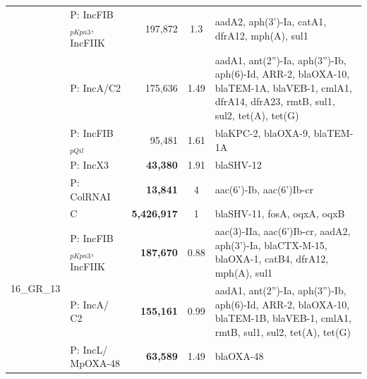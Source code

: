 \begin{landscape}
\begin{table}[!ht]
\begin{tabular}{|l|l|r|c|p{12cm}|}
                            & P: IncFIB$_{pKpn3}$, IncFIIK     & 197,872      & 1.3      & aadA2, aph(3')-Ia, catA1, dfrA12, mph(A), sul1                                                                                             \\ \cline{2-5} 
                            & P: IncA/C2                  & 175,636      & 1.49     & aadA1, ant(2'')-Ia, aph(3'')-Ib, aph(6)-Id, ARR-2, blaOXA-10, blaTEM-1A, blaVEB-1, cmlA1, dfrA14, dfrA23, rmtB, sul1, sul2, tet(A), tet(G) \\ \cline{2-5} 
                            & P: IncFIB$_{pQil}$               & 95,481       & 1.61     & blaKPC-2, blaOXA-9, blaTEM-1A                                                                                                              \\ \cline{2-5} 
                            & P: IncX3                    & \textbf{43,380}       & 1.91     & blaSHV-12                                                                                                                                  \\ \cline{2-5} 
                            & P: ColRNAI                  & \textbf{13,841}       & 4        & aac(6')-Ib, aac(6')Ib-cr                                                                                                                   \\ \hline \hline
\multirow{6}{*}{16\_GR\_13} & C                           & \textbf{5,426,917}     & 1        & blaSHV-11, fosA, oqxA, oqxB                                                                                                                \\ \cline{2-5} 
                            & P: IncFIB$_{pKpn3}$, IncFIIK     & \textbf{187,670}      & 0.88     & aac(3)-IIa, aac(6')Ib-cr, aadA2, aph(3')-Ia, blaCTX-M-15, blaOXA-1, catB4, dfrA12, mph(A), sul1                                            \\ \cline{2-5} 
                            & P: IncA/ C2                 & \textbf{155,161}      & 0.99     & aadA1, ant(2'')-Ia, aph(3'')-Ib, aph(6)-Id, ARR-2, blaOXA-10, blaTEM-1B, blaVEB-1, cmlA1, rmtB, sul1, sul2, tet(A), tet(G)                 \\ \cline{2-5} 
                            & P: IncL/ MpOXA-48           & \textbf{63,589}       & 1.49     & blaOXA-48                                                                                                                                  \\ \cline{2-5} 

\end{tabular}
\end{table}
\end{landscape}

